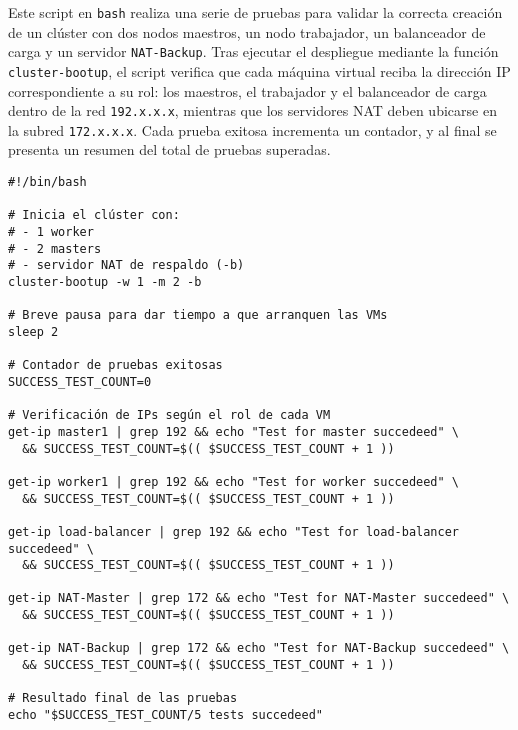 Este script en \texttt{bash} realiza una serie de pruebas para validar la correcta creación de un clúster con dos nodos maestros, un nodo trabajador, un balanceador de carga y un servidor \texttt{NAT-Backup}. Tras ejecutar el despliegue mediante la función \texttt{cluster-bootup}, el script verifica que cada máquina virtual reciba la dirección IP correspondiente a su rol: los maestros, el trabajador y el balanceador de carga dentro de la red \texttt{192.x.x.x}, mientras que los servidores NAT deben ubicarse en la subred \texttt{172.x.x.x}. Cada prueba exitosa incrementa un contador, y al final se presenta un resumen del total de pruebas superadas.  

\begin{verbatim}
#!/bin/bash

# Inicia el clúster con:
# - 1 worker
# - 2 masters
# - servidor NAT de respaldo (-b)
cluster-bootup -w 1 -m 2 -b

# Breve pausa para dar tiempo a que arranquen las VMs
sleep 2

# Contador de pruebas exitosas
SUCCESS_TEST_COUNT=0

# Verificación de IPs según el rol de cada VM
get-ip master1 | grep 192 && echo "Test for master succedeed" \
  && SUCCESS_TEST_COUNT=$(( $SUCCESS_TEST_COUNT + 1 ))

get-ip worker1 | grep 192 && echo "Test for worker succedeed" \
  && SUCCESS_TEST_COUNT=$(( $SUCCESS_TEST_COUNT + 1 ))

get-ip load-balancer | grep 192 && echo "Test for load-balancer succedeed" \
  && SUCCESS_TEST_COUNT=$(( $SUCCESS_TEST_COUNT + 1 ))

get-ip NAT-Master | grep 172 && echo "Test for NAT-Master succedeed" \
  && SUCCESS_TEST_COUNT=$(( $SUCCESS_TEST_COUNT + 1 ))

get-ip NAT-Backup | grep 172 && echo "Test for NAT-Backup succedeed" \
  && SUCCESS_TEST_COUNT=$(( $SUCCESS_TEST_COUNT + 1 ))

# Resultado final de las pruebas
echo "$SUCCESS_TEST_COUNT/5 tests succedeed"
\end{verbatim}